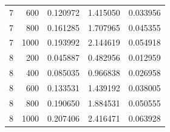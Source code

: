 \begin{table}[t]
\begin{tabular}{rrrrr}
7 & 600 & 0.120972 & 1.415050 & 0.033956 \\
7 & 800 & 0.161285 & 1.707965 & 0.045355 \\
7 & 1000 & 0.193992 & 2.144619 & 0.054918 \\
8 & 200 & 0.045887 & 0.482956 & 0.012959 \\
8 & 400 & 0.085035 & 0.966838 & 0.026958 \\
8 & 600 & 0.133531 & 1.439192 & 0.038005 \\
8 & 800 & 0.190650 & 1.884531 & 0.050555 \\
8 & 1000 & 0.207406 & 2.416471 & 0.063928 \\
\bottomrule
\end{tabular}
\end{table}
